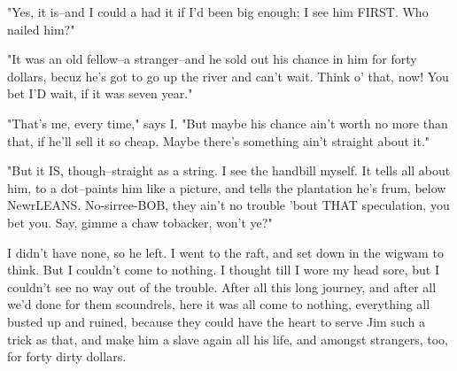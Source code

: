 "Yes, it is--and I could a had it if I'd been big enough; I see him
FIRST. Who nailed him?"

"It was an old fellow--a stranger--and he sold out his chance in him for
forty dollars, becuz he's got to go up the river and can't wait.  Think
o' that, now!  You bet I'D wait, if it was seven year."

"That's me, every time," says I.  "But maybe his chance ain't worth no
more than that, if he'll sell it so cheap.  Maybe there's something ain't
straight about it."

"But it IS, though--straight as a string.  I see the handbill myself.  It
tells all about him, to a dot--paints him like a picture, and tells the
plantation he's frum, below NewrLEANS.  No-sirree-BOB, they ain't no
trouble 'bout THAT speculation, you bet you.  Say, gimme a chaw tobacker,
won't ye?"

I didn't have none, so he left.  I went to the raft, and set down in the
wigwam to think.  But I couldn't come to nothing.  I thought till I wore
my head sore, but I couldn't see no way out of the trouble.  After all
this long journey, and after all we'd done for them scoundrels, here it
was all come to nothing, everything all busted up and ruined, because
they could have the heart to serve Jim such a trick as that, and make him
a slave again all his life, and amongst strangers, too, for forty dirty
dollars.

